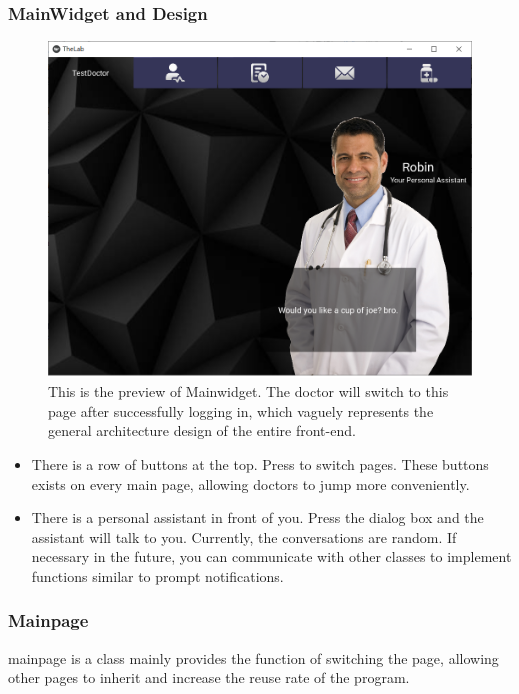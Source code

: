 \documentclass{article}
\begin{document}
\subsubsection*{MainWidget and Design}
\begin{figure}[ht]
    \centering
    \includegraphics[scale = 0.35]{asset/doctor_gui/frontend_main.png}
    \caption{This is the preview of Mainwidget. The doctor will switch to this page after successfully logging in, which vaguely represents the general architecture design of the entire front-end.}
    \label{fig:frontend_main}
\end{figure}
\begin{itemize}
    \item There is a row of buttons at the top. Press to switch pages. These buttons exists on every main page, allowing doctors to jump more conveniently.
    \item There is a personal assistant in front of you. Press the dialog box and the assistant will talk to you. Currently, the conversations are random. If necessary in the future, you can communicate with other classes to implement functions similar to prompt notifications.
\end{itemize}

\subsubsection*{Mainpage}
mainpage is a class mainly provides the function of 
switching the page, allowing other pages to inherit 
and increase the reuse rate of the program.
\end{document}
